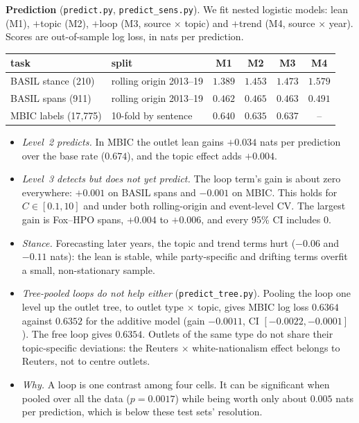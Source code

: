 \documentclass[11pt]{article}
\theoremstyle{definition}
\theoremstyle{remark}
\begin{document}
\textbf{Prediction} (\texttt{predict.py}, \texttt{predict\_sens.py}). We fit nested logistic models: lean (M1), $+$topic (M2), $+$loop (M3, source $\times$ topic) and $+$trend (M4, source $\times$ year). Scores are out-of-sample log loss, in nats per prediction.
\begin{center}\small
\begin{tabular}{llcccc}
\toprule
task & split & M1 & M2 & M3 & M4\\
\midrule
BASIL stance (210) & rolling origin 2013--19 & $\mathbf{1.389}$ & $1.453$ & $1.473$ & $1.579$\\
BASIL spans (911) & rolling origin 2013--19 & $\mathbf{0.462}$ & $0.465$ & $0.463$ & $0.491$\\
MBIC labels (17{,}775) & 10-fold by sentence & $0.640$ & $\mathbf{0.635}$ & $0.637$ & --\\
\bottomrule
\end{tabular}
\end{center}
\begin{itemize}
  \item \emph{Level~2 predicts.} In MBIC the outlet lean gains $+0.034$ nats per prediction over the base rate ($0.674$), and the topic effect adds $+0.004$.
  \item \emph{Level~3 detects but does not yet predict.} The loop term's gain is about zero everywhere: $+0.001$ on BASIL spans and $-0.001$ on MBIC. This holds for $C\in[0.1,10]$ and under both rolling-origin and event-level CV. The largest gain is Fox--HPO spans, $+0.004$ to $+0.006$, and every 95\% CI includes $0$.
  \item \emph{Stance.} Forecasting later years, the topic and trend terms hurt ($-0.06$ and $-0.11$ nats): the lean is stable, while party-specific and drifting terms overfit a small, non-stationary sample.
  \item \emph{Tree-pooled loops do not help either} (\texttt{predict\_tree.py}). Pooling the loop one level up the outlet tree, to outlet type $\times$ topic, gives MBIC log loss $0.6364$ against $0.6352$ for the additive model (gain $-0.0011$, CI $[-0.0022,-0.0001]$). The free loop gives $0.6354$. Outlets of the same type do not share their topic-specific deviations: the Reuters $\times$ white-nationalism effect belongs to Reuters, not to centre outlets.
  \item \emph{Why.} A loop is one contrast among four cells. It can be significant when pooled over all the data ($p=0.0017$) while being worth only about $0.005$ nats per prediction, which is below these test sets' resolution.
\end{itemize}
\end{document}
